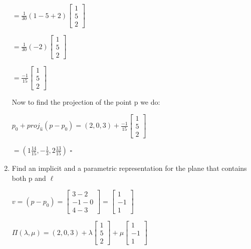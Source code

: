 \documentclass{article}
\begin{document}
\begin{enumerate}
        $= \frac{1}{30} (1 - 5 + 2) \begin{bmatrix} 1 \\ 5 \\ 2\end{bmatrix}$

        $= \frac{1}{30} (-2) \begin{bmatrix} 1 \\ 5 \\ 2\end{bmatrix}$

        $= \frac{-1}{15} \begin{bmatrix} 1 \\ 5 \\ 2\end{bmatrix}$

        Now to find the projection of the point p we do:

        $p_0 + proj_{\hat{u}}(p - p_0) = (2, 0, 3) + \frac{-1}{15} \begin{bmatrix} 1 \\ 5 \\ 2\end{bmatrix}$

        $ = (1 \frac{14}{15}, -\frac{1}{3}, 2 \frac{13}{15} )$ $\square$

        \item Find an implicit and a parametric representation for the plane that contains both p and $\ell$
       
        $v = (p - p_0) =  \begin{bmatrix} 3 - 2 \\ -1 - 0 \\ 4 - 3 \end{bmatrix} = \begin{bmatrix} 1 \\ -1 \\ 1 \end{bmatrix}$

        $\Pi(\lambda, \mu) = (2,0,3) + \lambda \begin{bmatrix} 1 \\ 5 \\ 2\end{bmatrix} + \mu \begin{bmatrix} 1 \\ -1 \\ 1 \end{bmatrix}$


\end{enumerate}
\end{document}
